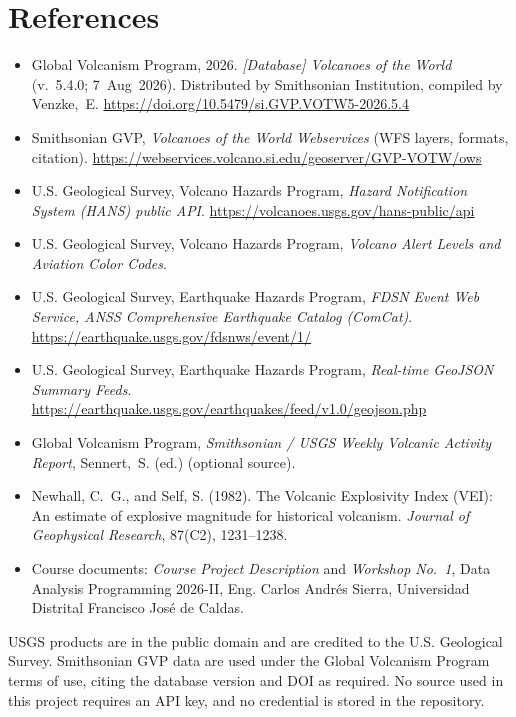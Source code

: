 \documentclass[11pt,a4paper]{article}
\begin{document}
\section{References}
\label{sec:references}

\begin{itemize}[leftmargin=0.6cm]
  \item Global Volcanism Program, 2026. \emph{[Database] Volcanoes of the World}
  (v.~5.4.0; 7~Aug~2026). Distributed by Smithsonian Institution, compiled by
  Venzke,~E. \url{https://doi.org/10.5479/si.GVP.VOTW5-2026.5.4}

  \item Smithsonian GVP, \emph{Volcanoes of the World Webservices} (WFS layers,
  formats, citation).
  \url{https://webservices.volcano.si.edu/geoserver/GVP-VOTW/ows}

  \item U.S. Geological Survey, Volcano Hazards Program, \emph{Hazard Notification
  System (HANS) public API}. \url{https://volcanoes.usgs.gov/hans-public/api}

  \item U.S. Geological Survey, Volcano Hazards Program, \emph{Volcano Alert Levels and
  Aviation Color Codes}.

  \item U.S. Geological Survey, Earthquake Hazards Program, \emph{FDSN Event Web
  Service, ANSS Comprehensive Earthquake Catalog (ComCat)}.
  \url{https://earthquake.usgs.gov/fdsnws/event/1/}

  \item U.S. Geological Survey, Earthquake Hazards Program, \emph{Real-time GeoJSON
  Summary Feeds}.
  \url{https://earthquake.usgs.gov/earthquakes/feed/v1.0/geojson.php}

  \item Global Volcanism Program, \emph{Smithsonian / USGS Weekly Volcanic Activity
  Report}, Sennert,~S. (ed.) (optional source).

  \item Newhall, C.~G., and Self, S. (1982). The Volcanic Explosivity Index (VEI): An
  estimate of explosive magnitude for historical volcanism. \emph{Journal of
  Geophysical Research}, 87(C2), 1231--1238.

  \item Course documents: \emph{Course Project Description} and \emph{Workshop No.~1},
  Data Analysis Programming 2026-II, Eng. Carlos Andr\'es Sierra, Universidad Distrital
  Francisco Jos\'e de Caldas.
\end{itemize}

\bigskip
\noindent
\small
USGS products are in the public domain and are credited to the U.S. Geological Survey.
Smithsonian GVP data are used under the Global Volcanism Program terms of use, citing
the database version and DOI as required. No source used in this project requires an
API key, and no credential is stored in the repository.
\end{document}
